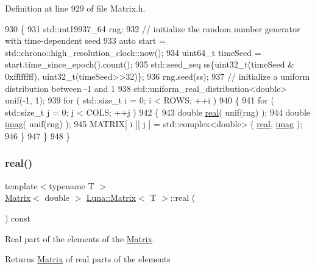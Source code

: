 Definition at line 929 of file Matrix.\+h.


\begin{DoxyCode}
930   \{
931     std::mt19937\_64 rng;
932     \textcolor{comment}{// initialize the random number generator with time-dependent seed}
933     \textcolor{keyword}{auto} start = std::chrono::high\_resolution\_clock::now();
934     uint64\_t timeSeed = start.time\_since\_epoch().count();
935     std::seed\_seq ss\{uint32\_t(timeSeed & 0xffffffff), uint32\_t(timeSeed>>32)\};
936     rng.seed(ss);
937     \textcolor{comment}{// initialize a uniform distribution between -1 and 1}
938     std::uniform\_real\_distribution<double> unif(-1, 1);
939     \textcolor{keywordflow}{for} ( std::size\_t i = 0; i < ROWS; ++i )
940     \{
941       \textcolor{keywordflow}{for} ( std::size\_t j = 0; j < COLS; ++j )
942       \{
943         \textcolor{keywordtype}{double} \hyperlink{classLuna_1_1Matrix_a0cabcec98047a9433948f3d80af436e6}{real}( unif(rng) );
944         \textcolor{keywordtype}{double} \hyperlink{classLuna_1_1Matrix_ac6e74a5d4ef4af6e6d574f9c059b5c01}{imag}( unif(rng) );
945         MATRIX[ i ][ j ] = std::complex<double> ( \hyperlink{classLuna_1_1Matrix_a0cabcec98047a9433948f3d80af436e6}{real}, \hyperlink{classLuna_1_1Matrix_ac6e74a5d4ef4af6e6d574f9c059b5c01}{imag} );
946       \}
947     \}
948   \}
\end{DoxyCode}
\mbox{\label{classLuna_1_1Matrix_a0cabcec98047a9433948f3d80af436e6}} 
\subsubsection{\texorpdfstring{real()}{real()}}
{\footnotesize\ttfamily template$<$typename T $>$ \\
\hyperlink{classLuna_1_1Matrix}{Matrix}$<$ double $>$ \hyperlink{classLuna_1_1Matrix}{Luna\+::\+Matrix}$<$ T $>$\+::real (\begin{DoxyParamCaption}{ }\end{DoxyParamCaption}) const\hspace{0.3cm}{\ttfamily [inline]}}



Real part of the elements of the \hyperlink{classLuna_1_1Matrix}{Matrix}. 

\begin{DoxyReturn}{Returns}
\hyperlink{classLuna_1_1Matrix}{Matrix} of real parts of the elements 
\end{DoxyReturn}


